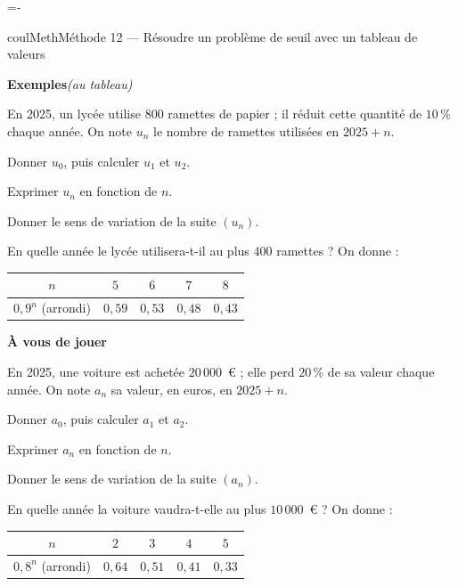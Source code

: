 \documentclass[11pt,a4paper]{article}
\makeatletter
\newcommand{\besoinplace}[1]{\par\penalty\@M\begingroup
  \dimen@=#1\relax\dimen@ii=\pagegoal\advance\dimen@ii-\pagetotal
  \ifdim\dimen@>\dimen@ii\ifdim\dimen@ii>\z@\vfil\fi\break\fi\endgroup}
\newcounter{lycee@signet}
\newcommand{\signet}[3][]{\stepcounter{lycee@signet}%
  \edef\lycee@dest{\if\relax\detokenize{#1}\relax
    signet.\arabic{lycee@signet}\else#1\fi}%
  \hypertarget{\lycee@dest}{}\bookmark[level=#2,dest=\lycee@dest]{#3}}
\newcounter{methode}
\newenvironment{methodebox}[1][Méthode]{\stepcounter{methode}%
  \begin{boitecours}[phantom={\signet[methode-\arabic{methode}]{2}{#1}}]{coulMeth}{#1}}%
  {\end{boitecours}}
\newcommand{\etape}[1]{\par\smallskip\textbf{\color{coulMeth}#1}\par\nobreak\smallskip}
\newcommand{\autableau}{\hfill{\footnotesize\itshape\color{black!45}(au tableau)}}
\newcommand{\etapeexemples}{%
    \par\smallskip\textbf{\color{coulMeth}Exemples}\autableau\par\nobreak\smallskip}
\makeatother
\begin{document}
\besoinplace{12\baselineskip}
\begin{methodebox}[Méthode 12 --- Résoudre un problème de seuil avec un tableau de valeurs]
\etapeexemples
En 2025, un lycée utilise $800$ ramettes de papier ; il réduit cette quantité de
$10\,\%$ chaque année. On note $u_{n}$ le nombre de ramettes utilisées en $2025+n$.
\begin{questions}[label=\alph*)]
  \item Donner $u_{0}$, puis calculer $u_{1}$ et $u_{2}$.
  \item Exprimer $u_{n}$ en fonction de $n$.
  \item Donner le sens de variation de la suite $(u_{n})$.
  \item En quelle année le lycée utilisera-t-il au plus $400$ ramettes ? On donne :
\end{questions}
\begin{center}
\renewcommand{\arraystretch}{1.3}
\begin{tabular}{|c|c|c|c|c|}
\hline
$n$ & $5$ & $6$ & $7$ & $8$\\
\hline
$0{,}9^{n}$ (arrondi) & $0{,}59$ & $0{,}53$ & $0{,}48$ & $0{,}43$\\
\hline
\end{tabular}
\end{center}

\etape{À vous de jouer}
En 2025, une voiture est achetée $20\,000$~€ ; elle perd $20\,\%$ de sa valeur chaque
année. On note $a_{n}$ sa valeur, en euros, en $2025+n$.
\begin{questions}[label=\alph*)]
  \item Donner $a_{0}$, puis calculer $a_{1}$ et $a_{2}$.
  \item Exprimer $a_{n}$ en fonction de $n$.
  \item Donner le sens de variation de la suite $(a_{n})$.
  \item En quelle année la voiture vaudra-t-elle au plus $10\,000$~€ ? On donne :
\end{questions}
\begin{center}
\renewcommand{\arraystretch}{1.3}
\begin{tabular}{|c|c|c|c|c|}
\hline
$n$ & $2$ & $3$ & $4$ & $5$\\
\hline
$0{,}8^{n}$ (arrondi) & $0{,}64$ & $0{,}51$ & $0{,}41$ & $0{,}33$\\
\hline
\end{tabular}
\end{center}

\end{methodebox}
\end{document}
